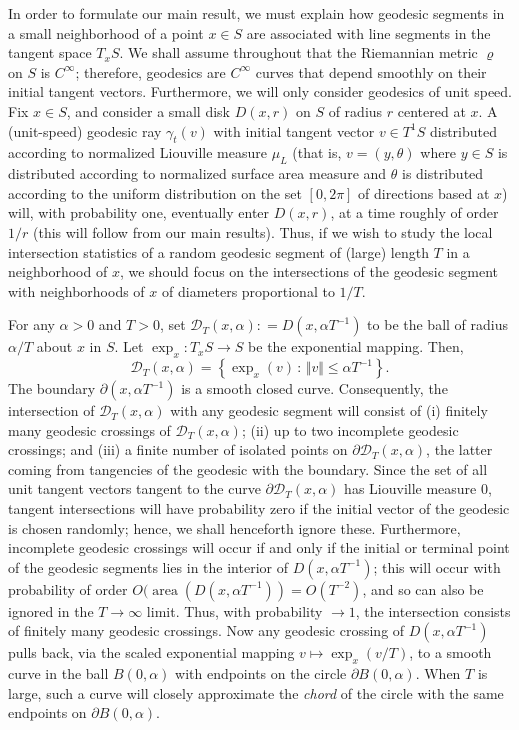 \documentclass[AHL, Unicode, longabstracts, published]{cedram}
\newcommand{\xset}[1]{\left\{ #1 \right\}}
\newcommand{\xnorm}[1]{ \Vert #1 \Vert }
\newcommand{\D}{\mathcal{D}}
\DeclareMathOperator{\area}{area}
\begin{document}
In order to formulate our main result, we must explain how geodesic segments in a small neighborhood of a point $x \in S$ are associated with line segments in the tangent space $T_{x}S$. We shall assume throughout that the Riemannian metric $\varrho$ on $S$ is $C^{\infty}$; therefore, geodesics are $C^{\infty}$ curves that depend smoothly on their initial tangent vectors. Furthermore, we will only consider geodesics of unit speed. Fix $x \in S$, and consider a small disk $D (x,r)$ on $S$ of radius $r$ centered at $x$. A (unit-speed) geodesic ray $\gamma_{t}(v) $ with initial tangent vector $v\in T^{1}S$ distributed according to normalized Liouville measure $\mu_{L}$ (that is, $v=(y,\theta)$ where $y\in S$ is distributed according to normalized surface area measure and $\theta$ is distributed according to the uniform distribution on the set $[0, 2\pi]$ of directions based at $x$) will, with probability one, eventually enter $D (x,r)$, at a time roughly of order $1/r$ (this will follow from our main results). Thus, if we wish to study the local intersection statistics of a random geodesic segment of (large) length $T$ in a neighborhood of $x$, we should focus on the intersections of the geodesic segment with neighborhoods of $x$ of diameters proportional to $1/T$.

For any $\alpha>0$ and $T>0$, set $\D_T(x,\alpha) : = D(x, \alpha T^{-1})$ to be the ball of radius $\alpha/T$ about $x$ in $S$. Let $\exp_{x}:T_{x}S \rightarrow S$ be the exponential mapping. Then,
\begin{equation}\label{eq:alphaNH}
\D_T(x,\alpha) = \xset {\exp_{x}(v)\,:\, \xnorm{v}\leq\alpha T^{-1}}.
\end{equation}
The boundary $\partial (x, \alpha T^{-1})$ is a smooth closed curve. Consequently, the intersection of $\D_T(x, \alpha)$ with any geodesic segment will consist of (i) finitely many geodesic crossings of $\mathcal{D}_{T}(x,\alpha)$; (ii) up to two incomplete geodesic crossings; and (iii) a finite number of isolated points on $\partial \mathcal{D}_{T}(x,\alpha)$, the latter coming from tangencies of the geodesic with the boundary. Since the set of all unit tangent vectors tangent to the curve $\partial \mathcal{D}_{T}(x,\alpha)$ has Liouville measure $0$, tangent intersections will have probability zero if the initial vector of the geodesic is chosen randomly; hence, we shall henceforth ignore these. Furthermore, incomplete geodesic crossings will occur if and only if the initial or terminal point of the geodesic segments lies in the interior of $D(x, \alpha T^{-1})$; this will occur with probability of order $O(\area (D(x, \alpha T^{-1}))=O(T^{-2})$, and so can also be ignored in the $T\rightarrow \infty$ limit. Thus, with probability $\rightarrow 1$, the intersection consists of finitely many geodesic crossings. Now any geodesic crossing of $D(x, \alpha T^{-1})$ pulls back, via the scaled exponential mapping $v \mapsto \exp_{x}(v/T)$, to a smooth curve in the ball $B(0, \alpha)$ with endpoints on the circle $\partial B(0, \alpha)$. When $T$ is large, such a curve will closely approximate the \emph{chord} of the circle with the same endpoints on $\partial B(0, \alpha)$.
\end{document}
